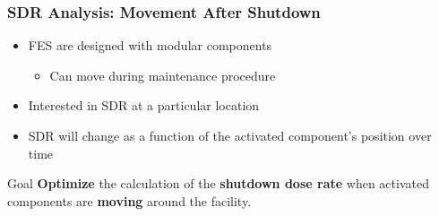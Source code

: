 \documentclass{beamer}
\begin{document}
%

\begin{frame}
\frametitle{SDR Analysis: Movement After Shutdown}
	\begin{itemize}
		\item{FES are designed with modular components}
	\begin{itemize}
		\item{Can move during maintenance procedure}
	\end{itemize}
		\item{Interested in SDR at a particular
					location}
		\item{SDR will change as a function of the
					activated component's position over
					time}
	\end{itemize}
	\begin{center}
	\end{center}
\end{frame}

\begin{frame}{Goal}
        \centering
	\textbf{Optimize} the %
	calculation of the \textbf{shutdown dose rate}
        when activated components are
	\textbf{moving} around the facility.
\end{frame}

\end{document}
